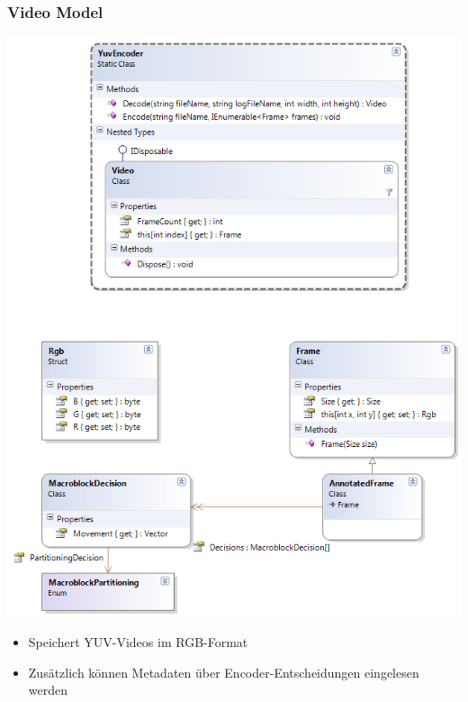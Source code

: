\documentclass[t]{beamer}
\begin{document}
\begin{frame}
\frametitle{Video Model}
\noindent
\begin{minipage}{5cm}
    \includegraphics[height=0.9\textheight]{../YuvKA.VideoModel/videomodel.png}
\end{minipage}
\hfill
\begin{minipage}{6cm}
    \begin{itemize}
        \item Speichert YUV-Videos im RGB-Format
        \item Zusätzlich können Metadaten über Encoder-Entscheidungen eingelesen werden
    \end{itemize}
\end{minipage}
\end{frame}
\end{document}
